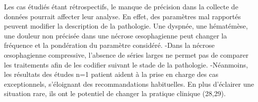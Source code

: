 \documentclass[./discussion]{subfiles}
\begin{document}
Les cas étudiés étant rétrospectifs, le manque de précision dans la collecte de données pourrait affecter leur analyse. En effet, des paramètres mal rapportés peuvent modifier la description de la pathologie. Une dyspnée, une hématémèse, une douleur non précisée dans une nécrose œsophagienne peut changer la fréquence et la pondération du paramètre considéré.
-Dans la nécrose œsophagienne compressive, l’absence de séries larges ne permet pas de comparer les traitements afin de les codifier suivant le stade de la pathologie.
-Néanmoins, les résultats des études n=1 patient aident à la prise en charge des cas exceptionnels, s’éloignant des recommandations habituelles. En plus d’éclairer une situation rare, ils ont le potentiel de changer la pratique clinique (28,29).
\end{document}
